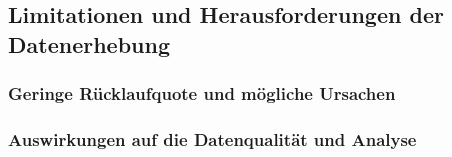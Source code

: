 \subsection{Limitationen und Herausforderungen der Datenerhebung}

\subsubsection{Geringe Rücklaufquote und mögliche Ursachen}

\subsubsection{Auswirkungen auf die Datenqualität und Analyse}
